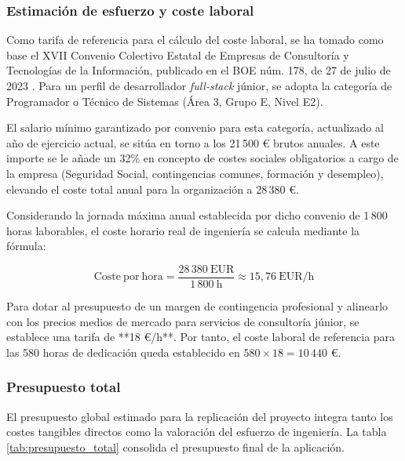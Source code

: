     \subsubsection{Estimación de esfuerzo y coste laboral}
    Como tarifa de referencia para el cálculo del coste laboral, se ha tomado como base el XVII Convenio Colectivo Estatal de Empresas de Consultoría y Tecnologías de la Información, publicado en el BOE núm. 178, de 27 de julio de 2023 \cite{boe_convenio_consultoria}. Para un perfil de desarrollador \textit{full-stack} júnior, se adopta la categoría de Programador o Técnico de Sistemas (Área 3, Grupo E, Nivel E2).

    El salario mínimo garantizado por convenio para esta categoría, actualizado al año de ejercicio actual, se sitúa en torno a los 21\,500 € brutos anuales. A este importe se le añade un 32\% en concepto de costes sociales obligatorios a cargo de la empresa (Seguridad Social, contingencias comunes, formación y desempleo), elevando el coste total anual para la organización a 28\,380 €. 

    Considerando la jornada máxima anual establecida por dicho convenio de 1\,800 horas laborables, el coste horario real de ingeniería se calcula mediante la fórmula:
    
    $$\mathrm{Coste\ por\ hora} = \frac{28\,380\ \mathrm{EUR}}{1\,800\ \mathrm{h}} \approx 15,76\ \mathrm{EUR/h}$$    
    
    Para dotar al presupuesto de un margen de contingencia profesional y alinearlo con los precios medios de mercado para servicios de consultoría júnior, se establece una tarifa de **18 \euro/h**. Por tanto, el coste laboral de referencia para las 580 horas de dedicación queda establecido en $580 \times 18 = 10\,440$ €.

    \subsubsection{Presupuesto total}

    El presupuesto global estimado para la replicación del proyecto integra tanto los costes tangibles directos como la valoración del esfuerzo de ingeniería. La tabla \ref{tab:presupuesto_total} consolida el presupuesto final de la aplicación.

